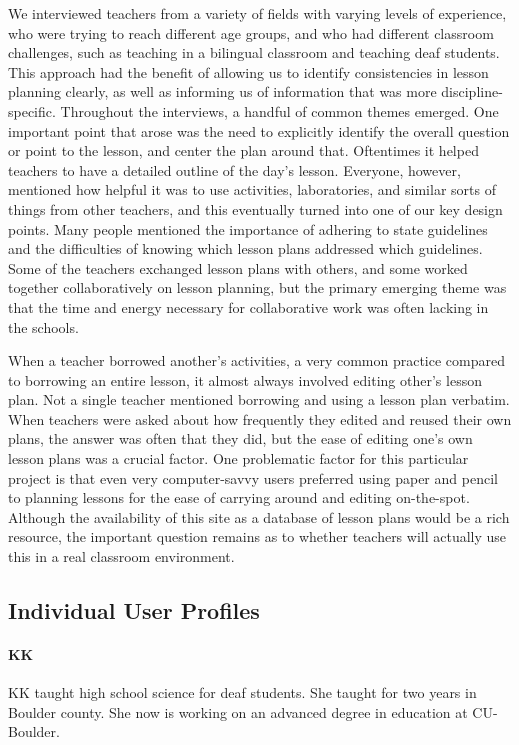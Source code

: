 We interviewed teachers from a variety of fields with varying levels of
experience, who were trying to reach different age groups, and who had different
classroom challenges, such as teaching in a bilingual classroom and teaching
deaf students.  This approach had the benefit of allowing  us to identify
consistencies in lesson planning clearly, as well as informing us of information
that was more discipline-specific.  Throughout the interviews, a handful of
common themes emerged.  One important point that arose was the need to
explicitly identify the overall question or point to the lesson, and center the
plan around that.  Oftentimes it helped teachers to have a detailed outline of
the day's lesson.  Everyone, however, mentioned how helpful it was to use
activities, laboratories, and similar sorts of things from other teachers, and
this eventually turned into one of our key design points.  Many people mentioned
the importance of adhering to state guidelines and the difficulties of knowing
which lesson plans addressed which guidelines.  Some of the teachers exchanged
lesson plans with others, and some worked together collaboratively on lesson
planning, but the primary emerging theme was that the time and energy necessary
for collaborative work was often lacking in the schools.

When a teacher borrowed another's activities, a very common practice compared to
borrowing an entire lesson, it almost always involved editing other's lesson
plan.  Not a single teacher mentioned borrowing and using a lesson plan
verbatim.  When teachers were asked about how frequently they edited and reused
their own plans, the answer was often that they did, but the ease of editing
one's own lesson plans was a crucial factor.  One problematic factor for this
particular project is that even very computer-savvy users preferred using paper
and pencil to planning lessons for the ease of carrying around and editing
on-the-spot.  Although the availability of this site as a database of lesson
plans would be a rich resource, the important question remains as to whether
teachers will actually use this in a real classroom environment.

\subsection{Individual User Profiles}
\paragraph{KK} KK taught high school science for deaf students.  She taught for
two years in Boulder county.  She now is working on an advanced degree in
education at CU-Boulder.

